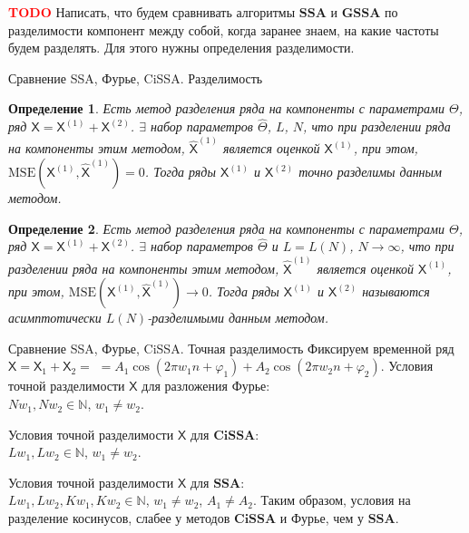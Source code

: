 \documentclass[notheorems, handout]{beamer}
\newtheorem{definition}{Определение}
\newcommand{\SSA}{\textbf{SSA}}
\newcommand{\GSSA}{\textbf{GSSA}}
\newcommand{\CISSA}{\textbf{CiSSA}}
\newcommand{\TS}{\mathsf{X}}
\begin{document}
	\begin{frame}
		\textcolor{red}{\textbf{TODO}} 
		Написать, что будем сравнивать алгоритмы $\SSA$ и $\GSSA$ по разделимости компонент между собой, когда заранее знаем, на какие частоты будем разделять. Для этого нужны определения разделимости.
	\end{frame}
	

	\begin{frame}{Сравнение SSA, Фурье, CiSSA. Разделимость}
		\begin{definition}
			\label{def:exact}
			Есть метод разделения ряда на компоненты с параметрами \( \Theta \), ряд \( \TS = \TS^{(1)} + \TS^{(2)} \). $\exists$ набор параметров \( \hat{\Theta} \), \( L \), \( N\), что при разделении ряда на компоненты этим методом, \( \hat{\TS}^{(1)} \) является оценкой \( \TS^{(1)} \), при этом, \( \mathrm{MSE}\left(\TS^{(1)}, \hat{\TS}^{(1)}\right) = 0 \). Тогда ряды \( \TS^{(1)} \) и \( \TS^{(2)} \) точно разделимы данным методом.
		\end{definition}
		\begin{definition}
			\label{def:asymp}
			Есть метод разделения ряда на компоненты с параметрами \( \Theta \), ряд \( \TS = \TS^{(1)} + \TS^{(2)} \). $\exists$ набор параметров \( \hat{\Theta} \) и \( L = L(N) \), \( N \rightarrow \infty \), что при разделении ряда на компоненты этим методом, \( \hat{\TS}^{(1)} \) является оценкой \( \TS^{(1)} \), при этом, \( \mathrm{MSE}\left(\TS^{(1)}, \hat{\TS}^{(1)}\right) \rightarrow 0 \). Тогда ряды \( \TS^{(1)} \) и \( \TS^{(2)} \) называются асимптотически \( L(N) \)-разделимыми данным методом.
		\end{definition}
	\end{frame}
	
	
	
	\begin{frame}{Сравнение SSA, Фурье, CiSSA. Точная разделимость}
		Фиксируем временной ряд $\TS = \TS_{1} + \TS_{2} =$ $= A_1 \cos(2\pi w_1 n + \varphi_1) + A_2 \cos(2\pi w_2 n + \varphi_2)$.
		\newline \newline
		Условия точной разделимости $\TS$ для разложения Фурье: \\
		$Nw_1, Nw_2 \in \mathbb{N}$, $w_1 \not = w_2$.
		
		Условия точной разделимости $\TS$ для $\CISSA$: \\
		$Lw_1, Lw_2 \in \mathbb{N}$, $w_1 \not = w_2$.
		
		Условия точной разделимости $\TS$ для $\SSA$: \\
		$Lw_1, Lw_2, Kw_1, Kw_2 \in \mathbb{N}$, $w_1 \not = w_2$, $A_1 \not = A_2$.
		\newline \newline
		Таким образом, условия на разделение косинусов, слабее у методов $\CISSA$ и Фурье, чем у $\SSA$.
	\end{frame}
	
\end{document}
